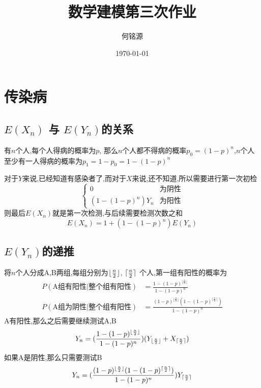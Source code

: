 \documentclass{ctexart}
\author{何铭源}
\date{\today}
\title{数学建模第三次作业}
\begin{document}
\maketitle
\section{传染病}
\subsection{$E(X_n)$ 与 $E(Y_n)$的关系}
有$n$个人,每个人得病的概率为$p$, 那么$n$个人都不得病的概率$p_0 = (1 - p)^n$,$n$个人至少有一人得病的概率为$p_1 = 1 - p_0 = 1 - (1 - p)^n$

对于$Y$来说,已经知道有感染者了,而对于$X$来说,还不知道,所以需要进行第一次初检
\begin{equation}
    \begin{cases}
        0 & \text{为阴性}\\
        (1 - (1 - p)^n)Y_n & \text{为阳性}
    \end{cases}
\end{equation}
则最后$E(X_n)$就是第一次检测,与后续需要检测次数之和
\begin{equation}
    E(X_n)= 1 + (1 - (1 - p) ^ n) E(Y_n)\label{tui}
\end{equation}
\subsection{$E(Y_n)$的递推}
将$n$个人分成A,B两组,每组分别为$\lfloor {n \over 2} \rfloor$, $\lceil {n \over 2}\rceil$ 个人,第一组有阳性的概率为
\begin{align}
    P(\text{A组有阳性} | \text{整个组有阳性}) &= \frac{1 - (1 - p) ^ {\lfloor\frac{n}{2}\rfloor}}{1 - (1 - p)^n}\\
    P(\text{A组为阴性} | \text{整个组有阳性}) &= \frac{(1 - p) ^ {\lfloor\frac{n}{2}\rfloor}(1 - (1 - p) ^ {\lceil\frac{n}{2}\rceil})}{1 - (1 - p)^n}
\end{align}
A有阳性,那么之后需要继续测试A,B
\[
Y_n = (\frac{1 - (1 - p) ^ {\lfloor\frac{n}{2}\rfloor}}{1 - (1 - p)^n})(Y_{\lfloor {n \over 2} \rfloor} + X_{\lceil {n \over 2} \rceil})
\]
如果A是阴性,那么只需要测试B
\[
Y_n = (\frac{(1 - p) ^ {\lfloor\frac{n}{2}\rfloor}(1 - (1 - p) ^ {\lceil\frac{n}{2}\rceil})}{1 - (1 - p)^n})Y_{\lceil {n \over 2} \rceil}
\]
\end{document}
